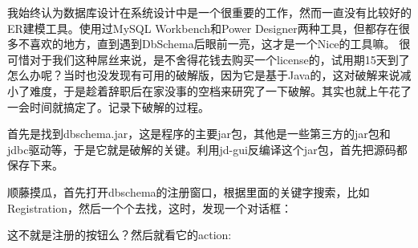 \documentclass[12pt]{article}
\begin{document}
\makeblogtitle

我始终认为数据库设计在系统设计中是一个很重要的工作，然而一直没有比较好的ER建模工具。使用过MySQL Workbench和Power Designer两种工具，但都存在很多不喜欢的地方，直到遇到DbSchema后眼前一亮，这才是一个Nice的工具嘛。 很可惜对于我们这种屌丝来说，是不舍得花钱去购买一个license的，试用期15天到了怎么办呢？当时也没发现有可用的破解版，因为它是基于Java的，这对破解来说减小了难度，于是趁着辞职后在家没事的空档来研究了一下破解。其实也就上午花了一会时间就搞定了。记录下破解的过程。

首先是找到dbschema.jar，这是程序的主要jar包，其他是一些第三方的jar包和jdbc驱动等，于是它就是破解的关键。利用jd-gui反编译这个jar包，首先把源码都保存下来。

顺藤摸瓜，首先打开dbschema的注册窗口，根据里面的关键字搜索，比如Registration，然后一个个去找，这时，发现一个对话框：

\begin{Shaded}
\begin{Highlighting}[]
 
\OperatorTok{=}  \OperatorTok{(}\OperatorTok{(}\OperatorTok{));}
\end{Highlighting}
\end{Shaded}

这不就是注册的按钮么？然后就看它的action:
\end{document}
